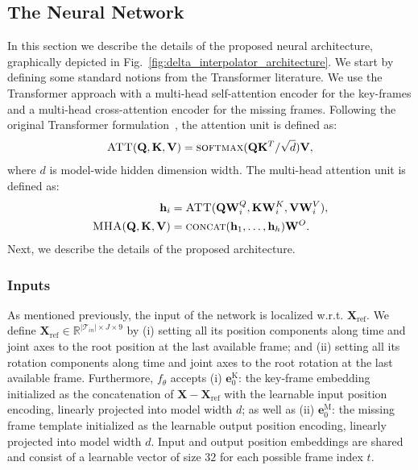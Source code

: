 \documentclass[letterpaper]{article} \usepackage[]{aaai23}  \usepackage{times}  \usepackage{helvet}  \usepackage{courier}  \usepackage[hyphens]{url}  \usepackage{graphicx} \urlstyle{rm} \def\UrlFont{\rm}  \usepackage{natbib}  \usepackage{caption} \frenchspacing  \setlength{\pdfpagewidth}{8.5in} \setlength{\pdfpageheight}{11in}
\renewcommand{\vec}[1]{\mathbf{#1}}
\DeclareMathOperator{\att}{\textsc{ATT}}
\DeclareMathOperator{\mha}{\textsc{MHA}}
\DeclareMathOperator{\softmax}{\textsc{softmax}}
\DeclareMathOperator{\concat}{\textsc{concat}}
\begin{document}
\subsection{The Neural Network}
In this section we describe the details of the proposed neural architecture, graphically depicted in Fig.~\ref{fig:delta_interpolator_architecture}. We start by defining some standard notions from the Transformer literature. We use the Transformer approach with a multi-head self-attention encoder for the key-frames and a multi-head cross-attention encoder for the missing frames. Following the original Transformer formulation~\cite{vaswani2017attention}, the attention unit is defined as:
\begin{align} \label{eqn:attention}
    \att(\vec{Q}, \vec{K}, \vec{\vec{V}}) = \softmax(\vec{Q} \vec{K}^T / \sqrt{d}) \vec{V},
\end{align}
where $d$ is model-wide hidden dimension width. The multi-head attention unit is defined as:
\begin{align}
    \vec{h}_i &= \att(\vec{Q} \vec{W}^{Q}_{i}, \vec{K} \vec{W}^{K}_{i}, \vec{\vec{V}} \vec{W}^{V}_{i}), \nonumber \\
    \mha(\vec{Q}, \vec{K}, \vec{\vec{V}}) &= \concat(\vec{h}_1, \ldots, \vec{h}_h) \vec{W}^{O}. \nonumber
\end{align}
Next, we describe the details of the proposed architecture.

\subsubsection{Inputs} 
As mentioned previously, the input of the network is localized w.r.t. $\vec{X}_{\textrm{ref}}$. We define $\vec{X}_{\textrm{ref}}  \in \mathbb{R}^{|\mathcal{T}_{in}| \times J \times 9}$ by (i) setting all its position components along time and joint axes to the root position at the last available frame; and (ii) setting all its rotation components along time and joint axes to the root rotation at the last available frame. Furthermore, $f_{\theta}$ accepts (i) $\vec{e}_{0}^{\textrm{K}}$: the key-frame embedding initialized as the concatenation of $\vec{X} - \vec{X}_{\textrm{ref}}$ with the learnable input position encoding, linearly projected into model width $d$; as well as (ii) $\vec{e}_{0}^{\textrm{M}}$: the missing frame template initialized as the learnable output position encoding, linearly projected into model width $d$. Input and output position embeddings are shared and consist of a learnable vector of size $32$ for each possible frame index $t$. 
\end{document}
